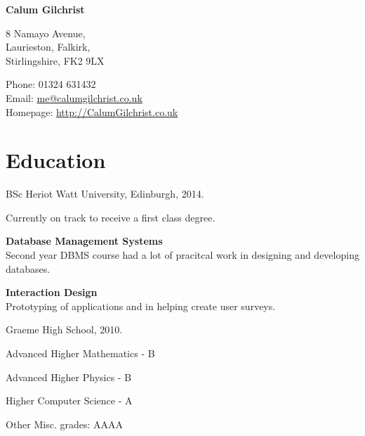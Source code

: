 \documentclass[11pt,a4paper]{article}
\def\name{Calum Gilchrist}
\renewenvironment{itemize}{
  \begin{list}{}{
    \setlength{\leftmargin}{1.5em}
    \setlength{\itemsep}{0.25em}
    \setlength{\parskip}{0pt}
    \setlength{\parsep}{0.25em}
    \renewcommand{\labelitemi}{$\bullet$}
  }
}{
  \end{list}
}
\begin{document}

\centerline{\huge \bf \name}

\bigskip

\begin{minipage}[t]{0.495\textwidth}
  8 Namayo Avenue, \\
  Laurieston, Falkirk, \\
  Stirlingshire, FK2 9LX
\end{minipage}
\begin{minipage}[t]{0.495\textwidth}
  Phone: 01324 631432 \\
  Email: \href{mailto:me@calumgilchrist.co.uk}{me@calumgilchrist.co.uk} \\
  Homepage: \href{http://calumgilchrist.co.uk/}{http://CalumGilchrist.co.uk}
\end{minipage}

\section*{Education}

\begin{itemize}
  \item BSc Heriot Watt University, Edinburgh, 2014.

    Currently on track to receive a first class degree.

    \begin{itemize}
        \item \textbf{Database Management Systems} \\
            Second year DBMS course had a lot of pracitcal work in designing and developing databases.
        \item \textbf{Interaction Design} \\
            Prototyping of applications and in helping create user surveys.
    \end{itemize}

  \item Graeme High School, 2010.

    \begin{itemize}
        \item Advanced Higher Mathematics - B
        \item Advanced Higher Physics - B
        \item Higher Computer Science - A
        \item Other Misc. grades: AAAA
    \end{itemize}
\end{itemize}
\end{document}

